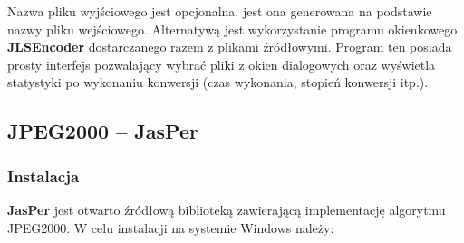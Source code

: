 Nazwa pliku wyjściowego jest opcjonalna, jest ona generowana na podstawie nazwy pliku wejściowego. Alternatywą jest wykorzystanie programu okienkowego \textbf{JLSEncoder} dostarczanego razem z plikami źródłowymi. Program ten posiada prosty interfejs pozwalający wybrać pliki z okien dialogowych oraz wyświetla statystyki po wykonaniu konwersji (czas wykonania, stopień konwersji itp.).

\subsection{JPEG2000 -- JasPer}

\subsubsection{Instalacja}

\textbf{JasPer} jest otwarto źródłową biblioteką zawierającą implementację algorytmu JPEG2000. W celu instalacji na systemie Windows należy:

